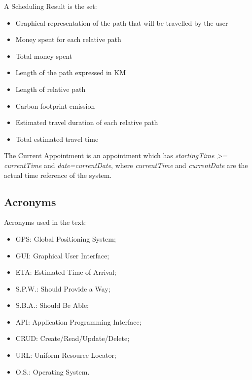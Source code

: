 \begin{definition} \label{def:schedulingResult}
A Scheduling Result is the set:
\begin{itemize}
\item Graphical representation of the path that will be travelled by the user
\item Money spent for each relative path
\item Total money spent 
\item Length of the path expressed in KM
\item Length of relative path 
\item Carbon footprint emission
\item Estimated travel duration of each relative path
\item Total estimated travel time
\end{itemize}
\end{definition}

\begin{definition} \label{def:currentAppointment}
The Current Appointment is an appointment which has \textit{startingTime >= currentTime } and \textit{date=currentDate}, where \textit{currentTime} and  \textit{currentDate} are the actual time reference of the system.
\end{definition}


\subsection{Acronyms}
Acronyms used in the text:
\begin{itemize}
\item GPS: Global Positioning System;
\item GUI: Graphical User Interface;
\item ETA: Estimated Time of Arrival;
\item S.P.W.: Should Provide a Way;
\item S.B.A.: Should Be Able;
\item API: Application Programming Interface;
\item CRUD: Create/Read/Update/Delete;
\item URL: Uniform Resource Locator;
\item O.S.: Operating System.
\end{itemize}



